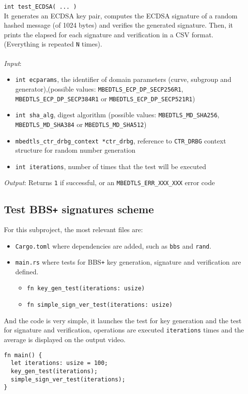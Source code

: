 \noindent
\texttt{int test\_ECDSA( ... )}\\
It generates an ECDSA key pair, computes the ECDSA signature of a random hashed message (of 1024 bytes) and verifies the generated signature. Then, it prints the elapsed for each signature and verification in a CSV format. (Everything is repeated \texttt{N} times). \\ \\
\textit{Input}:
\begin{itemize}[noitemsep,nolistsep]
  \item \texttt{int ecparams}, the identifier of domain parameters (curve, subgroup and generator),(possible values: \texttt{MBEDTLS\_ECP\_DP\_SECP256R1}, \texttt{MBEDTLS\_ECP\_DP\_SECP384R1} or \texttt{MBEDTLS\_ECP\_DP\_SECP521R1})
  \item \texttt{int sha\_alg}, digest algorithm (possible values: \texttt{MBEDTLS\_MD\_SHA256}, \texttt{MBEDTLS\_MD\_SHA384} or \texttt{MBEDTLS\_MD\_SHA512})
  \item \texttt{mbedtls\_ctr\_drbg\_context *ctr\_drbg}, reference to \texttt{CTR\_DRBG} context structure for random number generation
  \item \texttt{int iterations}, number of times that the test will be executed
\end{itemize}
\textit{Output}:  Returns \texttt{1} if successful, or an \texttt{MBEDTLS\_ERR\_XXX\_XXX} error code


\subsection*{Test BBS\texttt{+} signatures scheme}
For this subproject, the most relevant files are:
\begin{itemize}
  \item \texttt{Cargo.toml} where dependencies are added, such as  
  \texttt{bbs} and \texttt{rand}. 
  \item \texttt{main.rs} where tests for BBS\texttt{+} key generation, signature and verification are defined. 
  \begin{itemize} 
    \item \texttt{fn key\_gen\_test(iterations: usize)}
    \item \texttt{fn simple\_sign\_ver\_test(iterations: usize)}
  \end{itemize}
\end{itemize}
And the code is very simple, it launches the test for key generation and the test for signature and verification, operations are executed \texttt{iterations} times and the average is displayed on the output video. 
\begin{lstlisting}[frame=single]
fn main() {
  let iterations: usize = 100;
  key_gen_test(iterations);
  simple_sign_ver_test(iterations);
}
\end{lstlisting}


